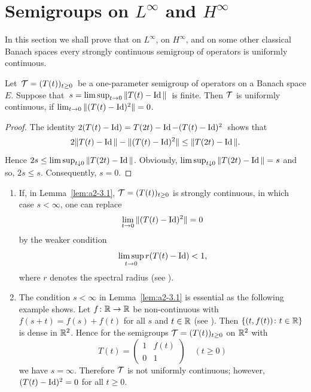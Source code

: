 \section{Semigroups on \texorpdfstring{$L^{\infty}$}{L-infty}  and \texorpdfstring{$H^{\infty}$}{H-infty} \label{sec:a2-3}}%
\hspace{1cm}{\Large by Heinrich P. Lotz}
\vspace{.5cm}
\newline
In this section we shall prove that on $L^\infty$, on $H^\infty$, and on some other classical Banach spaces every strongly continuous semigroup of operators is uniformly continuous.
\begin{lemma}\label{lem:a2-3.1}
Let\, $\TT = (T(t))_{t\geq 0}$\, be a one-parameter semigroup of operators on a Banach space $E$.
Suppose that\, $s = \limsup_{t\to 0} \|T(t) - \operatorname{Id}\|$\, is finite.
Then $\mathcal{T}$ is uniformly continuous, if\/ $\lim_{t\to 0} \|(T(t) - \operatorname{Id})^2\| = 0$.
\end{lemma}
\begin{proof}
The identity  $2(T(t) - \operatorname{Id}) = T(2t) - \operatorname{Id} - (T(t) - \operatorname{Id})^2$\, shows that
\[
	2\|T(t) - \Id\| - \|(T(t) - \Id)^{2} \| \leq \|T(2t) - \Id\| .
\]
Hence $2s \leq \limsup_{t \downarrow 0} \|T(2t) - \Id\|$.
Obviously, $\limsup_{t \downarrow 0} \|T(2t) - \operatorname{Id}\| = s$ and so, $2s \leq s$.
Consequently, $s = 0$.
\end{proof}
\begin{remarks*}\label{rem:a2-3.1-kgk}  
\begin{enumerate}[\upshape (i), wide, labelindent=.25em]
\item \label{rem:a2-3.1-kgk-1}
If, in Lemma~\ref{lem:a2-3.1}, $\TT = (T(t))_{t \geq 0}$ is strongly continuous, in which case 
$s < \infty$, one can replace 
%
\[
	\lim_{t \to 0} \|(T(t) - \operatorname{Id})^2\| = 0
\]
%
by the weaker condition 
\[
\limsup_{t \to 0} r(T(t) - \operatorname{Id}) < 1,
\]
where $r$ denotes the spectral radius (see \textcite[Lemma 2]{lotz:1985}).
\item \label{rem:a2-3.1-kgk-2}
The condition $s < \infty$ in Lemma~\ref{lem:a2-3.1}   
is essential as the following example shows.
Let $f \colon \mathbb{R} \to \mathbb{R}$ be non-continuous with $f(s+t) = f(s) + f(t)$ for all $s$ and $t \in \mathbb{R}$ (see \textcite{hamel:1905}).
Then $\{(t,f(t)) \colon t \in \mathbb{R}\}$ is dense in $\mathbb{R}^2$.
Hence for the semigroups $\TT = (T(t))_{t \geq 0}$ on $\mathbb{R}^2$ with
\[
T(t) = \left( \begin{array}{cc}
    1 & f(t) \\
    0 & 1
\end{array} \right) \quad  (t \geq 0)
\]
we have $s = \infty$.
Therefore $\mathcal{T}$ is not uniformly continuous; however, $(T(t) - \operatorname{Id})^{2} = 0$ for all $t \geq 0$.
\end{enumerate}
\end{remarks*}
